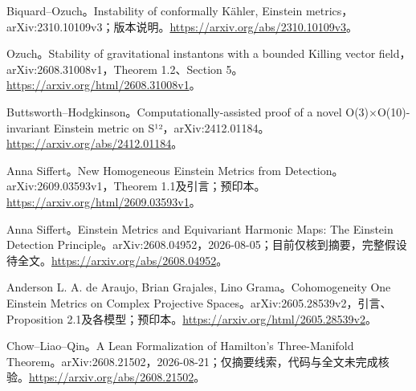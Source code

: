 \documentclass[11pt,a4paper]{article}
\theoremstyle{definition}
\begin{document}
\begin{enumerate}[label={[\arabic*]},leftmargin=2.2em,itemsep=0.55em]
\item Biquard--Ozuch。Instability of conformally Kähler, Einstein metrics，arXiv:2310.10109v3；版本说明。\url{https://arxiv.org/abs/2310.10109v3}。
\item Ozuch。Stability of gravitational instantons with a bounded Killing vector field，arXiv:2608.31008v1，Theorem 1.2、Section 5。\url{https://arxiv.org/html/2608.31008v1}。
\item Buttsworth--Hodgkinson。Computationally-assisted proof of a novel O(3)×O(10)-invariant Einstein metric on S¹²，arXiv:2412.01184。\url{https://arxiv.org/abs/2412.01184}。
\item Anna Siffert。New Homogeneous Einstein Metrics from Detection。arXiv:2609.03593v1，Theorem 1.1及引言；预印本。\url{https://arxiv.org/html/2609.03593v1}。
\item Anna Siffert。Einstein Metrics and Equivariant Harmonic Maps: The Einstein Detection Principle。arXiv:2608.04952，2026-08-05；目前仅核到摘要，完整假设待全文。\url{https://arxiv.org/abs/2608.04952}。
\item Anderson L. A. de Araujo, Brian Grajales, Lino Grama。Cohomogeneity One Einstein Metrics on Complex Projective Spaces。arXiv:2605.28539v2，引言、Proposition 2.1及各模型；预印本。\url{https://arxiv.org/html/2605.28539v2}。
\item Chow--Liao--Qin。A Lean Formalization of Hamilton's Three-Manifold Theorem。arXiv:2608.21502，2026-08-21；仅摘要线索，代码与全文未完成核验。\url{https://arxiv.org/abs/2608.21502}。
\end{enumerate}
\end{document}
